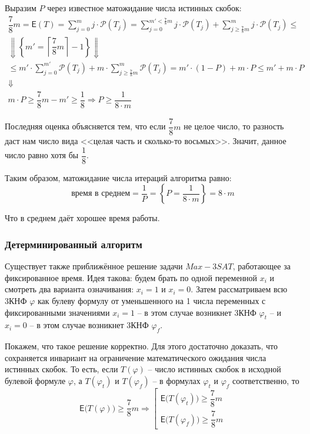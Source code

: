 \documentclass[a4paper,12pt]{article}
\renewcommand{\P}{\mathcal{P}}
\newcommand{\E}{\mathsf{E}}
\begin{document}
Выразим $P$ через известное матожидание числа истинных скобок:
\begin{gather*}
    \dfrac{7}{8}m = \E(T) = \sum\limits_{j = 0}^m j \cdot \P(T_j) = \sum\limits_{j = 0}^{m' < \frac{7}{8}m} j \cdot \P(T_j) + \sum\limits_{j \geqslant \frac{7}{8}m}^m j \cdot \P(T_j) \leqslant \\ \Downarrow\left\{m' = \left\lceil\dfrac{7}{8}m\right\rceil - 1 \right\}\Downarrow\\
    \leqslant m' \cdot \sum\limits_{j = 0}^{m'}\P(T_j) + m \cdot \sum\limits_{j \geqslant \frac{7}{8}m}^m \P(T_j) = m' \cdot(1 - P) + m \cdot P \leqslant m' + m \cdot P 
    \\ \Downarrow\\
    m \cdot P \geqslant \dfrac{7}{8}m - m' \geqslant \dfrac{1}{8} \Longrightarrow P \geqslant \dfrac{1}{8\cdot m}
\end{gather*}

Последняя оценка объясняется тем, что если $\dfrac{7}{8}m$ не целое число, то разность даст нам число вида <<целая часть и сколько-то восьмых>>. Значит, данное число равно хотя бы $\dfrac{1}{8}$.

Таким образом, матожидание числа итераций алгоритма равно:
\[\text{время в среднем} = \dfrac{1}{P} = \left\{P = \dfrac{1}{8\cdot m}\right\} = 8 \cdot m\]

Что в среднем даёт хорошее время работы.

\subsubsection{Детерминированный алгоритм}

Существует также приближённое решение задачи $Max-3SAT$, работающее за фиксированное время. Идея такова: будем брать по одной переменной $x_i$ и смотреть два варианта означивания: $x_i = 1$ и $x_i = 0$. Затем рассматриваем всю 3КНФ $\varphi$ как булеву формулу от уменьшенного на 1 числа переменных с фиксированными значениями $x_i = 1$ -- в этом случае возникнет 3КНФ $\varphi_t$ --  и $x_i = 0$ -- в этом случае возникнет 3КНФ $\varphi_f$.

Покажем, что такое решение корректно. Для этого достаточно доказать, что сохраняется инвариант на ограничение математического ожидания числа истинных скобок. То есть, если $T(\varphi)$ -- число истинных скобок в исходной булевой формуле $\varphi$, а  $T(\varphi_t)$ и $T(\varphi_f)$ -- в формулах $\varphi_t$ и $\varphi_f$ соответственно, то
\[\E\big(T(\varphi)\big) \geqslant \dfrac{7}{8}m \Longrightarrow \left[\begin{gathered}\E \big(T(\varphi_t)\big) \geqslant \dfrac{7}{8}m \\ \E \big(T(\varphi_f)\big)\geqslant \dfrac{7}{8}m\end{gathered}\right.\]
\end{document}
